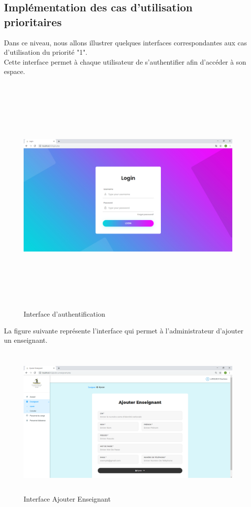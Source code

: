 \documentclass[12 pt]{report}
\begin{document}
\subsection{Implémentation des cas d'utilisation prioritaires }
Dans ce niveau, nous allons illustrer quelques interfaces correspondantes aux cas d'utilisation du priorité "1".\\

Cette interface permet à chaque utilisateur de s’authentifier afin d’accéder à son espace.


\begin{figure}[h]
 \begin{center}
\includegraphics[width= 18 cm ,height=  12cm]{login.PNG}
\caption{Interface d'authentification}

\end{center}
\end{figure}\newpage
La figure suivante représente l'interface qui permet à l'administrateur d'ajouter un enseignant.
\begin{figure}[h]
 \begin{center}
\includegraphics[width= 18 cm ,height=7.5cm]{ajouter_enseignant.PNG}
\caption{Interface Ajouter Enseignant}

\end{center}
\end{figure} \\
\end{document}
